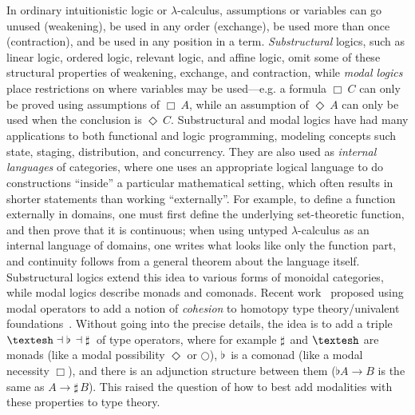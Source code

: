 \documentclass[a4paper,USenglish,numberwithinsect]{lipics-v2016}
\newcommand\Bx[2]{\ensuremath{\Box_{#1} \, {#2}}}
\newcommand\Dia[2]{\ensuremath{\Diamond_{#1} \, {#2}}}
\newcommand\Flat[1]{\ensuremath{\flat \, {#1}}}
\newcommand\Sharp[1]{\ensuremath{\sharp \, {#1}}}
\newcommand{\sh}{\text{\textesh}}
\newcommand\la\dashv
\begin{document}
In ordinary intuitionistic logic or $\lambda$-calculus, assumptions or
variables can go unused (weakening), be used in any order (exchange), be
used more than once (contraction), and be used in any position in a
term.  \emph{Substructural} logics, such as linear logic, ordered logic,
relevant logic, and affine logic, omit some of these structural
properties of weakening, exchange, and contraction, while \emph{modal
  logics} place restrictions on where variables may be used---e.g. a
formula $\Bx{} C$ can only be proved using assumptions of $\Bx{} A$,
while an assumption of $\Dia{}{A}$ can only be used when the conclusion
is $\Dia{}{C}$.  Substructural and modal logics have had many
applications to both functional and logic programming, modeling concepts
such state, staging, distribution, and concurrency.  They are also used
as \emph{internal languages} of categories, where one uses an
appropriate logical language to do constructions ``inside'' a particular
mathematical setting, which often results in shorter statements than
working ``externally''.  For example, to define a function externally in
domains, one must first define the underlying set-theoretic function,
and then prove that it is continuous; when using untyped
$\lambda$-calculus as an internal language of domains, one writes what
looks like only the function part, and continuity follows from a general
theorem about the language itself.  Substructural logics extend this
idea to various forms of monoidal categories, while modal logics
describe monads and comonads.  Recent
work~\cite{schreibershulman12cohesive,shulman15realcohesion} proposed
using modal operators to add a notion of \emph{cohesion} to homotopy
type theory/univalent
foundations~\cite{voevodsky06homotopy,uf13hott-book}.  Without going
into the precise details, the idea is to add a triple $\sh{} \la \Flat{}
\la \Sharp{}$ of type operators, where for example $\Sharp{}$ and
$\sh{}$ are monads (like a modal possibility $\Diamond$ or $\bigcirc$),
$\Flat{}$ is a comonad (like a modal necessity $\Box$), and there is an
adjunction structure between them ($\flat{A} \to B$ is the same as $A
\to \Sharp{B}$).  This raised the question of how to best add modalities
with these properties to type theory.
\end{document}
